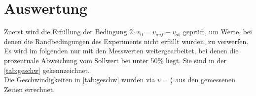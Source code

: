 \section{Auswertung}
\label{sec:Auswertung}



Zuerst wird die Erfüllung der Bedingung $2 \cdot v_0 = v_{auf} - v_{ab}$ geprüft, um Werte, bei denen die Randbedingungen
des Experiments nicht erfüllt wurden, zu verwerfen. Es wird im folgenden nur mit den Messwerten weitergearbeitet, bei denen die 
prozentuale Abweichung vom Sollwert bei unter 50\% liegt. Sie sind in der \autoref{tab:geschw} gekennzeichnet. \\
Die Geschwindigkeiten in \autoref{tab:geschw} wurden via $v = \frac{s}{t}$ aus den gemessenen Zeiten errechnet.\\

